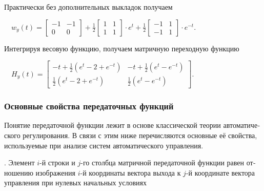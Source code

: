 \documentclass[a4paper]{article}
\begin{document}
{\begin{russian}\sffamily
Практически без дополнительных выкладок получаем
\end{russian}}


\bigskip


\bigskip

{\begin{russian}\sffamily
\ \  $w_y(t)=\left[\begin{matrix}-1&-1\\0&0\end{matrix}\right]+\frac 1
2\left[\begin{matrix}1&1\\1&1\end{matrix}\right]\cdot e^t+\frac 1
2\left[\begin{matrix}-1&1\\-1&1\end{matrix}\right]\cdot e^{-t}$.\ \ 
\end{russian}}

{\begin{russian}\sffamily
Интегрируя весовую функцию, получаем матричную переходную функцию
\end{russian}}

{\begin{russian}\sffamily
\ \  $H_y(t)=\left[\begin{matrix}-t+\frac 1 2\left(e^t-2+e^{-t}\right)&-t+\frac 1 2\left(e^t-e^{-t}\right)\\\frac 1
2\left(e^t-2+e^{-t}\right)&\frac 1 2\left(e^t-e^{-t}\right)\end{matrix}\right]$.
\end{russian}}


\bigskip


\bigskip

\subsubsection{Основные свойства передаточных функций}
\hypertarget{RefHeadingToc455659710}{}
\bigskip

{\begin{russian}\sffamily
Понятие передаточной функции лежит в основе классической теории автоматического регулирования. В связи с этим ниже
перечисляются основные её свойства, используемые при анализе систем автоматического управления.
\end{russian}}

{\begin{russian}. Элемент  $i$-й строки и  $j$-го столбца матричной передаточной функции равен отношению изображения  $i$-й координаты
вектора выхода к  $j$-й координате вектора управления при нулевых начальных условиях
\end{russian}}
\end{document}
